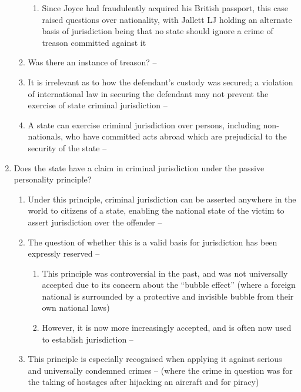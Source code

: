 \begin{enumerate}
\begin{enumerate}
        \begin{enumerate}
            \item Since Joyce had fraudulently acquired his British passport, this case raised questions over nationality, with Jallett LJ holding an alternate basis of jurisdiction being that no state should ignore a crime of treason committed against it
        \end{enumerate}
        \item Was there an instance of treason? -- 
        \item It is irrelevant as to how the defendant's custody was secured; a violation of international law in securing the defendant may not prevent the exercise of state criminal jurisdiction -- 
        \item A state can exercise criminal jurisdiction over persons, including non-nationals, who have committed acts abroad which are prejudicial to the security of the state -- 
    \end{enumerate}
    \item Does the state have a claim in criminal jurisdiction under the passive personality principle?
    \begin{enumerate}
        \item Under this principle, criminal jurisdiction can be asserted anywhere in the world to citizens of a state, enabling the national state of the victim to assert jurisdiction over the offender -- 
        \item The question of whether this is a valid basis for jurisdiction has been expressly reserved -- 
        \begin{enumerate}
            \item This principle was controversial in the past, and was not universally accepted due to its concern about the ``bubble effect'' (where a foreign national is surrounded by a protective and invisible bubble from their own national laws)
            \item However, it is now more increasingly accepted, and is often now used to establish jurisdiction -- 
        \end{enumerate}
        \item This principle is especially recognised when applying it against serious and universally condemned crimes --  (where the crime in question was for the taking of hostages after hijacking an aircraft and for piracy)

\end{enumerate}
\end{enumerate}
